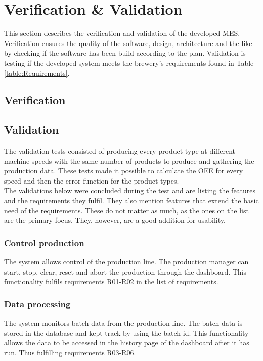 \section{Verification \& Validation}
This section describes the verification and validation of the developed MES.\\

Verification ensures the quality of the software, design, architecture and the
like by checking if the software has been build according to the plan.
Validation is testing if the developed system meets the brewery's requirements
found in Table \ref{table:Requirements}.

\subsection{Verification}

\subsection{Validation}
The validation tests consisted of producing every product type at different
machine speeds with the same number of products to produce and gathering the
production data. These tests made it possible to calculate the OEE for every
speed and then the error function for the product types.\\

The validations below were concluded during the test and are listing the
features and the requirements they fulfil. They also mention features that
extend the basic need of the requirements. These do not matter as much, as the
ones on the list are the primary focus. They, however, are a good addition for
usability.

\subsubsection{Control production} 
The system allows control of the production line. The production manager can
start, stop, clear, reset and abort the production through the dashboard. This
functionality fulfils requirements R01-R02 in the list of requirements.

\subsubsection{Data processing}
The system monitors batch data from the production line. The batch data is
stored in the database and kept track by using the batch id. This functionality
allows the data to be accessed in the history page of the dashboard after it has
run. Thus fulfilling requirements R03-R06.

